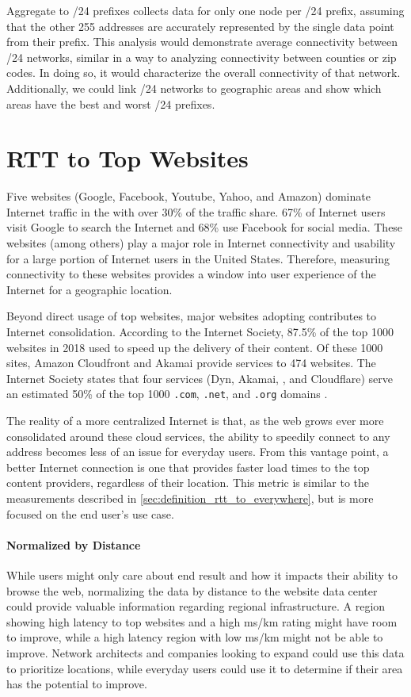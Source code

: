 Aggregate \rtt to /24 prefixes collects data for only one node per /24 prefix, assuming that the other 255 addresses are accurately represented by the single data point from their prefix. This analysis would demonstrate average connectivity between /24 networks, similar in a way to analyzing connectivity between counties or zip codes. In doing so, it would characterize the overall connectivity of that network. Additionally, we could link /24 networks to geographic areas and show which areas have the best and worst /24 prefixes.

\section{RTT to Top Websites}\label{sec:definition_rtt_site_ping}
Five websites (Google, Facebook, Youtube, Yahoo, and Amazon) dominate Internet traffic in the \us with over 30\% of the traffic share. 67\% of \us Internet users visit Google to search the Internet and 68\% use Facebook for social media\cite{Tachalova2017}. These websites (among others) play a major role in Internet connectivity and usability for a large portion of Internet users in the United States. Therefore, measuring connectivity to these websites provides a window into user experience of the Internet for a geographic location.

Beyond direct usage of top websites, major websites adopting \cdns contributes to Internet consolidation. According to the Internet Society, 87.5\% of the top 1000 websites in 2018 used \cdns to speed up the delivery of their content. Of these 1000 sites, Amazon Cloudfront and Akamai provide \cdn services to 474 websites. The Internet Society states that four services (Dyn, Akamai, \AWS, and Cloudflare) serve an estimated 50\% of the top 1000 \texttt{.com}, \texttt{.net}, and \texttt{.org} domains \cite{TheInternetSociety2019}.

The reality of a more centralized Internet is that, as the web grows ever more consolidated around these cloud services, the ability to speedily connect to any \ip address becomes less of an issue for everyday users. From this vantage point, a better Internet connection is one that provides faster load times to the top content providers, regardless of their location. This metric is similar to the \rtt measurements described in \ref{sec:definition_rtt_to_everywhere}, but is more focused on the end user's use case.

\paragraph{Normalized by Distance}
While users might only care about end result and how it impacts their ability to browse the web, normalizing the data by distance to the website data center could provide valuable information regarding regional infrastructure. A region showing high latency to top websites and a high ms/km rating might have room to improve, while a high latency region with low ms/km might not be able to improve. Network architects and companies looking to expand could use this data to prioritize locations, while everyday users could use it to determine if their area has the potential to improve.

